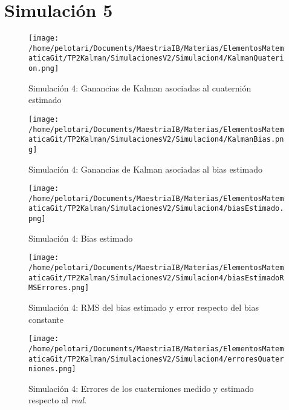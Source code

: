 \documentclass[a4paper,11pt,twoside]{IT-CNEA}
\begin{document}
\section{Simulación 5}
\begin{figure}[h!]
\centering
\texttt{[image: /home/pelotari/Documents/MaestriaIB/Materias/ElementosMatematicaGit/TP2Kalman/SimulacionesV2/Simulacion4/KalmanQuaterion.png]}
\caption{Simulación 4:  Ganancias de Kalman asociadas al cuaternión estimado}
\label{fig:Simulacion4/KalmanQuaterion}
\end{figure}
\begin{figure}[h!]
\centering
\texttt{[image: /home/pelotari/Documents/MaestriaIB/Materias/ElementosMatematicaGit/TP2Kalman/SimulacionesV2/Simulacion4/KalmanBias.png]}
\caption{Simulación 4:  Ganancias de Kalman asociadas al bias estimado}
\label{fig:Simulacion4/KalmanBias}
\end{figure}
\begin{figure}[h!]
\centering
\texttt{[image: /home/pelotari/Documents/MaestriaIB/Materias/ElementosMatematicaGit/TP2Kalman/SimulacionesV2/Simulacion4/biasEstimado.png]}
\caption{Simulación 4:  Bias estimado}
\label{fig:Simulacion4/biasEstimado}
\end{figure}
\begin{figure}[h!]
\centering
\texttt{[image: /home/pelotari/Documents/MaestriaIB/Materias/ElementosMatematicaGit/TP2Kalman/SimulacionesV2/Simulacion4/biasEstimadoRMSErrores.png]}
\caption{Simulación 4:  RMS del bias estimado y error respecto del bias constante}
\label{fig:Simulacion4/biasEstimadoRMSErrores}
\end{figure}
\begin{figure}[h!]
\centering
\texttt{[image: /home/pelotari/Documents/MaestriaIB/Materias/ElementosMatematicaGit/TP2Kalman/SimulacionesV2/Simulacion4/erroresQuaterniones.png]}
\caption{Simulación 4:  Errores de los cuaterniones medido y estimado respecto al \textit{real}.}
\label{fig:Simulacion4/erroresQuaterniones}
\end{figure}
\clearpage
\newpage


\end{document}
